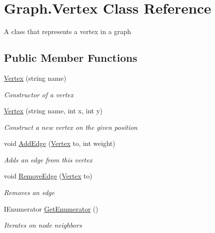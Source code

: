 \hypertarget{class_graph_1_1_vertex}{}\section{Graph.\+Vertex Class Reference}
\label{class_graph_1_1_vertex}


A class that represents a vertex in a graph  


\subsection*{Public Member Functions}
\begin{DoxyCompactItemize}
\item 
\hyperlink{class_graph_1_1_vertex_a65e1270ac657e57f3b4ed62434bc1a14}{Vertex} (string name)
\begin{DoxyCompactList}\small\item\em Constructor of a vertex \end{DoxyCompactList}\item 
\hyperlink{class_graph_1_1_vertex_ab0e830faa738a8c022a7c24b0f86ab9c}{Vertex} (string name, int x, int y)
\begin{DoxyCompactList}\small\item\em Construct a new vertex on the given position \end{DoxyCompactList}\item 
void \hyperlink{class_graph_1_1_vertex_ac356de9ce319961880faa5f7390435fa}{Add\+Edge} (\hyperlink{class_graph_1_1_vertex}{Vertex} to, int weight)
\begin{DoxyCompactList}\small\item\em Adds an edge from this vertex \end{DoxyCompactList}\item 
void \hyperlink{class_graph_1_1_vertex_a634f39ee548903000dd1b8c702351fe8}{Remove\+Edge} (\hyperlink{class_graph_1_1_vertex}{Vertex} to)
\begin{DoxyCompactList}\small\item\em Removes an edge \end{DoxyCompactList}\item 
I\+Enumerator \hyperlink{class_graph_1_1_vertex_a74a735028c6c203ddc42f63033dcb66a}{Get\+Enumerator} ()
\begin{DoxyCompactList}\small\item\em Iterates on node neighbors \end{DoxyCompactList}\item 

\end{DoxyCompactItemize}
